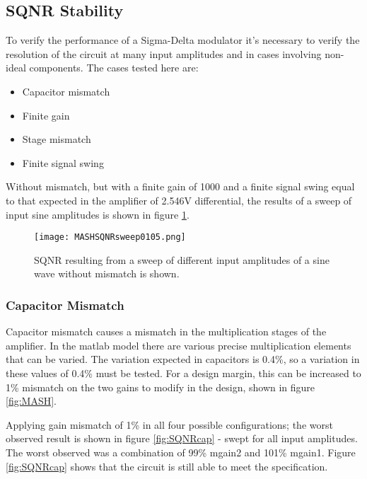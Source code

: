     \subsection{SQNR Stability}
    To verify the performance of a Sigma-Delta modulator it's necessary to verify the resolution of the circuit at many input amplitudes and in cases involving non-ideal components.
    The cases tested here are:
    \begin{itemize}
        \item Capacitor mismatch
        \item Finite gain
        \item Stage mismatch
        \item Finite signal swing
    \end{itemize}

    Without mismatch, but with a finite gain of 1000 and a finite signal swing equal to that expected in the amplifier of 2.546V differential, the results of a sweep of input sine amplitudes is shown in figure \ref{fig:SQNRnominal}.

    \begin{figure}
        \begin{center}
        \texttt{[image: MASHSQNRsweep0105.png]}
        \label{fig:SQNRnominal}
        \caption{SQNR resulting from a sweep of different input amplitudes of a sine wave without mismatch is shown.}
        \end{center}
    \end{figure}  



        \subsubsection{Capacitor Mismatch}
        Capacitor mismatch causes a mismatch in the multiplication stages of the amplifier.
        In the matlab model there are various precise multiplication elements that can be varied.
        The variation expected in capacitors is 0.4\%, so a variation in these values of 0.4\% must be tested.
        For a design margin, this can be increased to 1\% mismatch on the two gains to modify in the design, shown in figure \ref{fig:MASH}.

        Applying gain mismatch of 1\% in all four possible configurations; the worst observed result is shown in figure \ref{fig:SQNRcap} - swept for all input amplitudes.
        The worst observed was a combination of 99\% mgain2 and 101\% mgain1.
        Figure \ref{fig:SQNRcap} shows that the circuit is still able to meet the specification.
 
